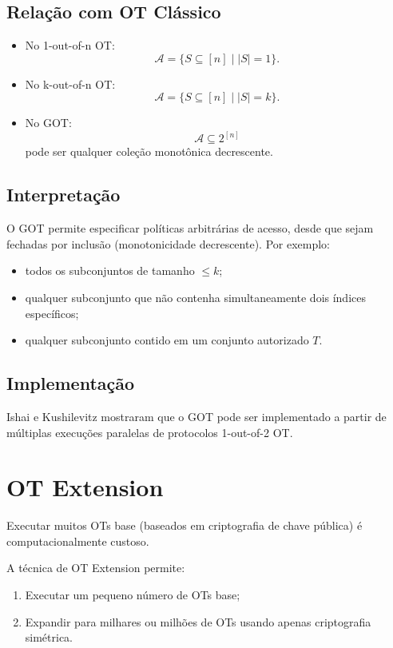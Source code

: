 \documentclass[12pt, oneside, a4paper, english, brazil]{abntex2}
\begin{document}
\subsection{Relação com OT Clássico}

\begin{itemize}
\item No 1-out-of-n OT:
\[ \mathcal{A} = \{S \subseteq [n] \mid |S| = 1\}. \]
\item No k-out-of-n OT:
\[ \mathcal{A} = \{S \subseteq [n] \mid |S| = k\}. \]
\item No GOT:
\[ \mathcal{A} \subseteq 2^{[n]} \]
pode ser qualquer coleção monotônica decrescente.
\end{itemize}

\subsection{Interpretação}

O GOT permite especificar políticas arbitrárias de acesso, desde que sejam
fechadas por inclusão (monotonicidade decrescente). Por exemplo:

\begin{itemize}
\item todos os subconjuntos de tamanho $\leq k$;
\item qualquer subconjunto que não contenha simultaneamente dois índices
específicos;
\item qualquer subconjunto contido em um conjunto autorizado $T$.
\end{itemize}

\subsection{Implementação}

Ishai e Kushilevitz mostraram que o GOT pode ser implementado a partir de
múltiplas execuções paralelas de protocolos 1-out-of-2 OT.

\section{OT Extension}

Executar muitos OTs base (baseados em criptografia de chave pública) é
computacionalmente custoso.

A técnica de OT Extension permite:

\begin{enumerate}
\item Executar um pequeno número de OTs base;
\item Expandir para milhares ou milhões de OTs usando apenas criptografia
simétrica.
\end{enumerate}
\end{document}
